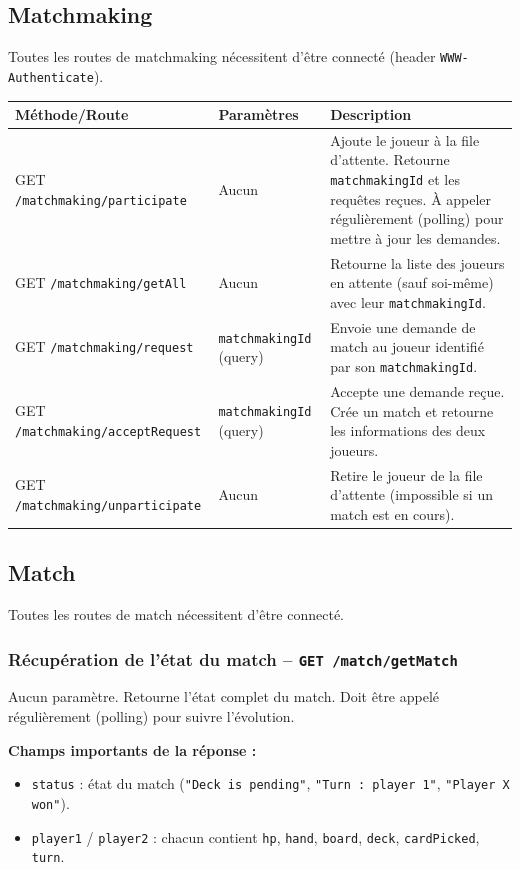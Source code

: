 \documentclass[12pt,a4paper]{article}
\begin{document}
\subsection{Matchmaking}

Toutes les routes de matchmaking nécessitent d'être connecté (header \texttt{WWW-Authenticate}).

\begin{tabularx}{\textwidth}{l l X}
\toprule
\textbf{Méthode/Route} & \textbf{Paramètres} & \textbf{Description} \\
\midrule
GET \texttt{/matchmaking/participate} & Aucun & Ajoute le joueur à la file d'attente. Retourne \texttt{matchmakingId} et les requêtes reçues. À appeler régulièrement (polling) pour mettre à jour les demandes. \\
\midrule
GET \texttt{/matchmaking/getAll} & Aucun & Retourne la liste des joueurs en attente (sauf soi-même) avec leur \texttt{matchmakingId}. \\
\midrule
GET \texttt{/matchmaking/request} & \texttt{matchmakingId} (query) & Envoie une demande de match au joueur identifié par son \texttt{matchmakingId}. \\
\midrule
GET \texttt{/matchmaking/acceptRequest} & \texttt{matchmakingId} (query) & Accepte une demande reçue. Crée un match et retourne les informations des deux joueurs. \\
\midrule
GET \texttt{/matchmaking/unparticipate} & Aucun & Retire le joueur de la file d'attente (impossible si un match est en cours). \\
\bottomrule
\end{tabularx}

\subsection{Match}

Toutes les routes de match nécessitent d'être connecté.

\subsubsection{Récupération de l'état du match -- \texttt{GET /match/getMatch}}

Aucun paramètre. Retourne l'état complet du match. Doit être appelé régulièrement (polling) pour suivre l'évolution.

\vspace{0.2cm}
\textbf{Champs importants de la réponse :}
\begin{itemize}[noitemsep]
    \item \texttt{status} : état du match (\texttt{"Deck is pending"}, \texttt{"Turn : player 1"}, \texttt{"Player X won"}).
    \item \texttt{player1} / \texttt{player2} : chacun contient \texttt{hp}, \texttt{hand}, \texttt{board}, \texttt{deck}, \texttt{cardPicked}, \texttt{turn}.
\end{itemize}
\end{document}
